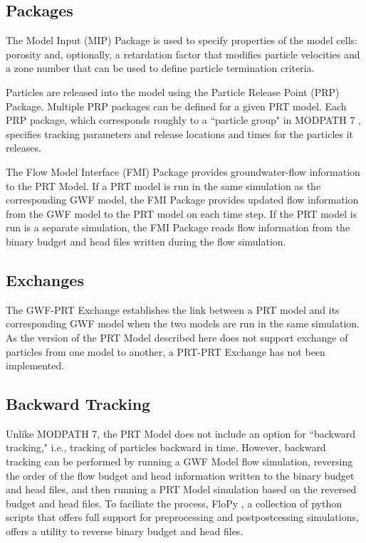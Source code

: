 \subsection{Packages} \label{sec:packages}

The Model Input (MIP) Package is used to specify properties of the model cells: porosity and, optionally, a retardation factor that modifies particle velocities and a zone number that can be used to define particle termination criteria.

Particles are released into the model using the Particle Release Point (PRP) Package. Multiple PRP packages can be defined for a given PRT model. Each PRP package, which corresponds roughly to a ``particle group" in MODPATH 7 \citep{pollock2016modpath7}, specifies tracking parameters and release locations and times for the particles it releases.

The Flow Model Interface (FMI) Package provides groundwater-flow information to the PRT Model. If a PRT model is run in the same simulation as the corresponding GWF model, the FMI Package provides updated flow information from the GWF model to the PRT model on each time step. If the PRT model is run is a separate simulation, the FMI Package reads flow information from the binary budget and head files written during the flow simulation.

\subsection{Exchanges} \label{sec:exchanges}

The GWF-PRT Exchange establishes the link between a PRT model and its corresponding GWF model when the two models are run in the same simulation. As the version of the PRT Model described here does not support exchange of particles from one model to another, a PRT-PRT Exchange has not been implemented.

\subsection{Backward Tracking} \label{sec:backwardtracking}

Unlike MODPATH 7, the PRT Model does not include an option for ``backward tracking," i.e., tracking of particles backward in time. However, backward tracking can be performed by running a GWF Model flow simulation, reversing the order of the flow budget and head information written to the binary budget and head files, and then running a PRT Model simulation based on the reversed budget and head files. To faciliate the process, FloPy \citep{bakker2016flopy, hughes2023flopy, flopysoftware}, a collection of python scripts that offers full support for preprocessing and postpostcessing \mf simulations, offers a utility to reverse binary budget and head files.

